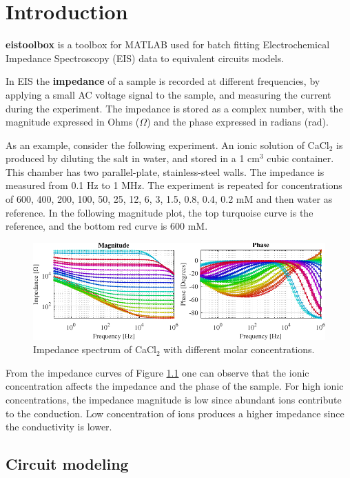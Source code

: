 \documentclass[10pt,b5paper,oneside]{book}
\begin{document}
\chapter{Introduction}

\textbf{eistoolbox} is a toolbox for MATLAB\textregistered{} used for batch fitting Electrochemical Impedance Spectroscopy (EIS) data to equivalent circuits models.

In EIS the \textbf{impedance} of a sample is recorded at different frequencies, by applying a small AC voltage signal to the sample, and measuring the current during the experiment. The impedance is stored as a complex number, with the magnitude expressed in Ohms ($\Omega$) and the phase expressed in radians (rad).

As an example, consider the following experiment. An ionic solution of CaCl$_2$ is produced by diluting the salt in water, and stored in a 1 cm$^3$ cubic container. This chamber has two parallel-plate, stainless-steel walls. The impedance is measured from 0.1 Hz to 1 MHz. The experiment is repeated for concentrations of 600, 400, 200, 100, 50, 25, 12, 6, 3, 1.5, 0.8, 0.4, 0.2 mM and then water as reference. In the following magnitude plot, the top turquoise curve is the reference, and the bottom red curve is 600 mM.

\begin{figure}[H]
	\centering
	\includegraphics[width=\textwidth]{cacl2}
	\small
	\caption{Impedance spectrum of CaCl$_2$ with different molar concentrations.}
	\label{eiscacl2}
\end{figure}

\clearpage
From the impedance curves of Figure \ref{eiscacl2} one can observe that the ionic concentration affects the impedance and the phase of the sample. For high ionic concentrations, the impedance magnitude is low since abundant ions contribute to the conduction. Low concentration of ions produces a higher impedance since the conductivity is lower.

\section{Circuit modeling}
\end{document}
